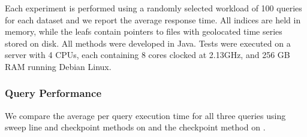 Each experiment is performed using a randomly selected workload of 100 queries for each dataset and we report the average response time. All indices are held in memory, while the leafs contain pointers to files with geolocated time series stored on disk. All methods were developed in Java. Tests were executed on a server with 4 CPUs, each containing 8 cores clocked at 2.13GHz, and 256 GB RAM running Debian Linux.

\subsubsection{Query Performance}
\label{subsec:query_perf}

We compare the average per query execution time for all three queries using sweep line and checkpoint methods on \btsr and the checkpoint method on \sbtsr.


